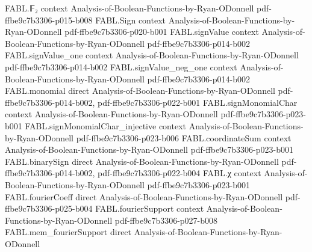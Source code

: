 \begin{theorem}
\label{FABL.goldreichLevinStageEstimateProgram_queries_le}
\leanok
{}
\proofstep
  {FABL.𝔽₂}
  {context}
  {Analysis-of-Boolean-Functions-by-Ryan-ODonnell}
  {pdf-ffbe9c7b3306-p015-b008}
\proofstep
  {FABL.Sign}
  {context}
  {Analysis-of-Boolean-Functions-by-Ryan-ODonnell}
  {pdf-ffbe9c7b3306-p020-b001}
\proofstep
  {FABL.signValue}
  {context}
  {Analysis-of-Boolean-Functions-by-Ryan-ODonnell}
  {pdf-ffbe9c7b3306-p014-b002}
\proofstep
  {FABL.signValue_one}
  {context}
  {Analysis-of-Boolean-Functions-by-Ryan-ODonnell}
  {pdf-ffbe9c7b3306-p014-b002}
\proofstep
  {FABL.signValue_neg_one}
  {context}
  {Analysis-of-Boolean-Functions-by-Ryan-ODonnell}
  {pdf-ffbe9c7b3306-p014-b002}
\proofstep
  {FABL.monomial}
  {direct}
  {Analysis-of-Boolean-Functions-by-Ryan-ODonnell}
  {pdf-ffbe9c7b3306-p014-b002,
    pdf-ffbe9c7b3306-p022-b001}
\proofstep
  {FABL.signMonomialChar}
  {context}
  {Analysis-of-Boolean-Functions-by-Ryan-ODonnell}
  {pdf-ffbe9c7b3306-p023-b001}
\proofstep
  {FABL.signMonomialChar_injective}
  {context}
  {Analysis-of-Boolean-Functions-by-Ryan-ODonnell}
  {pdf-ffbe9c7b3306-p023-b006}
\proofstep
  {FABL.coordinateSum}
  {context}
  {Analysis-of-Boolean-Functions-by-Ryan-ODonnell}
  {pdf-ffbe9c7b3306-p023-b001}
\proofstep
  {FABL.binarySign}
  {direct}
  {Analysis-of-Boolean-Functions-by-Ryan-ODonnell}
  {pdf-ffbe9c7b3306-p014-b002,
    pdf-ffbe9c7b3306-p022-b004}
\proofstep
  {FABL.χ}
  {context}
  {Analysis-of-Boolean-Functions-by-Ryan-ODonnell}
  {pdf-ffbe9c7b3306-p023-b001}
\proofstep
  {FABL.fourierCoeff}
  {direct}
  {Analysis-of-Boolean-Functions-by-Ryan-ODonnell}
  {pdf-ffbe9c7b3306-p025-b004}
\proofstep
  {FABL.fourierSupport}
  {context}
  {Analysis-of-Boolean-Functions-by-Ryan-ODonnell}
  {pdf-ffbe9c7b3306-p027-b008}
\proofstep
  {FABL.mem_fourierSupport}
  {direct}
  {Analysis-of-Boolean-Functions-by-Ryan-ODonnell}

\end{theorem}
